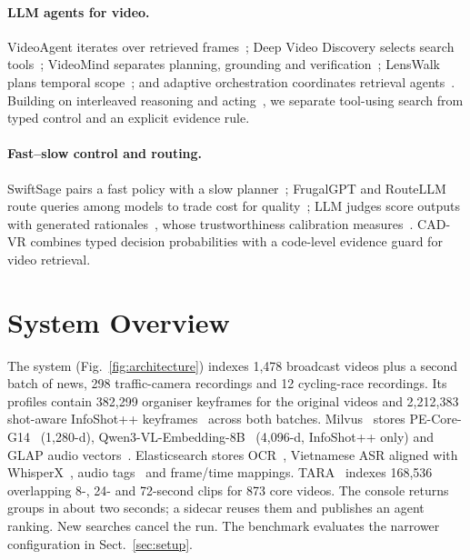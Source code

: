 \documentclass[runningheads]{llncs}
\begin{document}
\paragraph{LLM agents for video.}
VideoAgent iterates over retrieved frames~\cite{videoagent2024}; Deep Video Discovery selects search tools~\cite{dvd2025}; VideoMind separates planning, grounding and verification~\cite{videomind2026}; LensWalk plans temporal scope~\cite{lenswalk2026}; and adaptive orchestration coordinates retrieval agents~\cite{wu2026adaptive}. Building on interleaved reasoning and acting~\cite{react2023}, we separate tool-using search from typed control and an explicit evidence rule.

\paragraph{Fast--slow control and routing.}
SwiftSage pairs a fast policy with a slow planner~\cite{swiftsage2023}; FrugalGPT and RouteLLM route queries among models to trade cost for quality~\cite{frugalgpt2024,routellm2025}; LLM judges score outputs with generated rationales~\cite{zheng2023judge}, whose trustworthiness calibration measures~\cite{guo2017calibration}. CAD-VR combines typed decision probabilities with a code-level evidence guard for video retrieval.

\section{System Overview}
\label{sec:overview}
The system (Fig.~\ref{fig:architecture}) indexes 1,478 broadcast videos plus a second batch of news, 298 traffic-camera recordings and 12 cycling-race recordings. Its profiles contain 382,299 organiser keyframes for the original videos and 2,212,383 shot-aware InfoShot++ keyframes~\cite{infoshot2026} across both batches. Milvus~\cite{milvus2021} stores PE-Core-G14~\cite{pe2025} (1,280-d), Qwen3-VL-Embedding-8B~\cite{qwen2026} (4,096-d, InfoShot++ only) and GLAP audio vectors~\cite{glap2025}. Elasticsearch stores OCR~\cite{hunyuanocr2025}, Vietnamese ASR aligned with WhisperX~\cite{phowhisper2024,whisperx2023}, audio tags~\cite{ced2023} and frame/time mappings. TARA~\cite{tara2026} indexes 168,536 overlapping 8-, 24- and 72-second clips for 873 core videos. The console returns groups in about two seconds; a sidecar reuses them and publishes an agent ranking. New searches cancel the run. The benchmark evaluates the narrower configuration in Sect.~\ref{sec:setup}.
\end{document}
